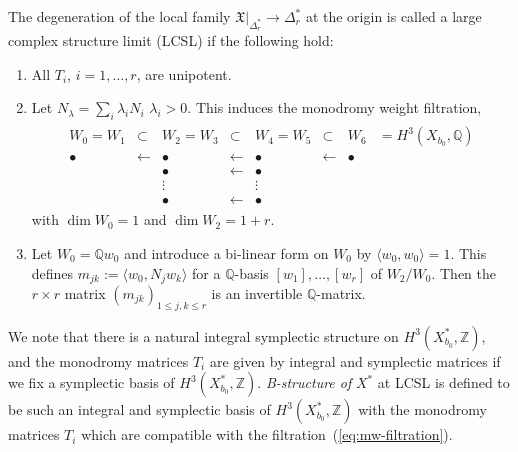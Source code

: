 \documentclass[10pt,a4paper]{amsart}
\numberwithin{equation}{section}
\begin{document}
\begin{Definition} \label{def:LCSL}The degeneration of the local family $\mathfrak{X}|_{\Delta_{r}^{*}}\to\Delta_{r}^{*}$ at the origin is called a large complex structure limit (LCSL) if the following hold:
\begin{enumerate}\itemsep=0pt
\item[(1)] All $T_{i}$, $i=1,\dots,r$, are unipotent.

\item[(2)] Let $N_{\lambda}=\sum_{i}\lambda_{i}N_{i}$ $\lambda_{i}>0$. This induces the monodromy weight filtration,
\begin{gather}
\begin{matrix}W_{0}=W_{1} & \subset & W_{2}=W_{3} & \subset & W_{4}=W_{5} & \subset & W_{6} & =H^{3}(X_{b_{0}},\mathbb{Q})\\
\bullet & \leftarrow & \bullet & \leftarrow & \bullet & \leftarrow & \bullet\\
 & & \bullet & \leftarrow & \bullet\\
 & & \vdots & & \vdots\\
 & & \bullet & \leftarrow & \bullet
\end{matrix}\label{eq:mw-filtration}
\end{gather}
with $\dim W_{0}=1$ and $\dim W_{2}=1+r$.

\item[(3)] Let $W_{0}=\mathbb{Q}w_{0}$ and introduce a bi-linear form on $W_{0}$ by $\langle w_{0},w_{0}\rangle=1$. This defines $m_{jk}:=\langle w_{0},N_{j}w_{k}\rangle$ for a $\mathbb{Q}$-basis $[w_{1}],\dots,[w_{r}]$ of $W_{2}/W_{0}$. Then the $r\times r$ matrix $(m_{jk})_{1\leq j,k\leq r}$ is an invertible $\mathbb{Q}$-matrix.
\end{enumerate}
\end{Definition}

We note that there is a natural integral symplectic structure on $H^{3}(X_{b_{0}}^{*},\mathbb{Z})$, and the mono\-dromy matrices $T_{i}$ are given by integral and symplectic matrices if we fix a symplectic basis of $H^{3}(X_{b_{0}}^{*},\mathbb{Z})$. \textit{B-structure of} $X^{*}$ at LCSL is defined to be such an integral and symplectic basis of $H^{3}(X_{b_{0}}^{*},\mathbb{Z})$ with the monodromy matrices $T_{i}$ which are compatible with the filtration~(\ref{eq:mw-filtration}).
\end{document}
